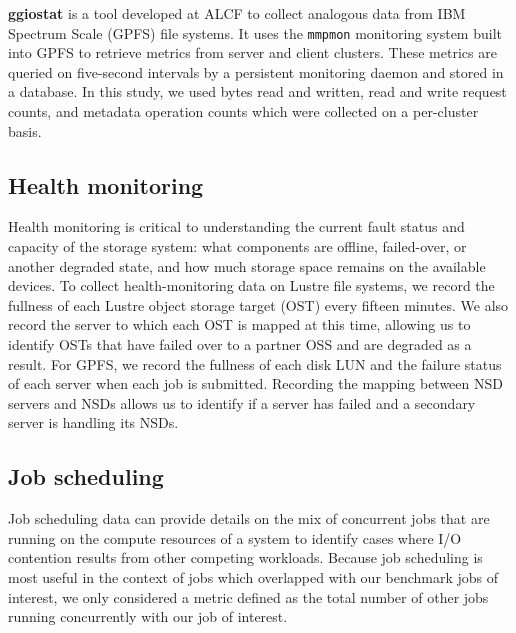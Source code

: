 \label{sec:methods/ggiostat}
\textbf{ggiostat} is a tool developed at ALCF to collect analogous data from IBM Spectrum Scale (GPFS) file systems.
It uses the \texttt{mmpmon} monitoring system built into GPFS to retrieve metrics from server and client clusters.
These metrics are queried on five-second intervals by a persistent monitoring daemon and stored in a database.
In this study, we used bytes read and written, read and write request counts, and metadata operation counts which were collected on a per-cluster basis.

\subsection{Health monitoring} \label{sec:methods/health}

Health monitoring is critical to understanding the current fault status and capacity of the
storage system: what components are offline, failed-over, or another degraded state, and how much storage space remains on the available devices.
To collect health-monitoring data on Lustre file systems, we record the fullness of each Lustre object storage target (OST) every fifteen minutes.
We also record the server to which each OST is mapped at this time, allowing us to identify OSTs that have failed over to a partner OSS and are degraded as a result.
For GPFS, we record the fullness of each disk LUN and the failure status of each server when each job is submitted.
Recording the mapping between NSD servers and NSDs allows us to identify if a server has failed and a secondary server is handling its NSDs.

\subsection{Job scheduling} \label{sec:methods/scheduling}

Job scheduling data can provide details on the mix of concurrent jobs that are running on the compute resources of a system to identify cases where I/O contention results from other competing workloads.
Because job scheduling is most useful in the context of jobs which overlapped with our benchmark jobs of interest, we only considered a metric defined as the total number of other jobs running concurrently with our job of interest.

